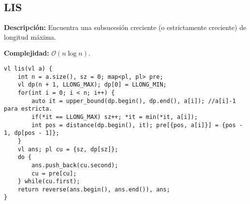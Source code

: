 \documentclass[twocolumn]{article}
\begin{document}
\subsection{LIS}
\begin{footnotesize}{\bf Descripción:} Encuentra una subsucesión creciente (o estrictamente creciente) de longitud máxima.


{\bf Complejidad:} $\mathcal{O}(n \log n)$.
\end{footnotesize}\lstset{basicstyle=\footnotesize\ttfamily,breaklines=true,tabsize=2,language=C++,frame=leftline, numbers=left, numberstyle=\tiny, numbersep=5pt}
\begin{lstlisting}
vl lis(vl a) {
	int n = a.size(), sz = 0; map<pl, pl> pre;
	vl dp(n + 1, LLONG_MAX); dp[0] = LLONG_MIN;
	for(int i = 0; i < n; i++) {
		auto it = upper_bound(dp.begin(), dp.end(), a[i]); //a[i]-1 para estricta.
		if(*it == LLONG_MAX) sz++; *it = min(*it, a[i]);
		int pos = distance(dp.begin(), it); pre[{pos, a[i]}] = {pos - 1, dp[pos - 1]};
	}
	vl ans; pl cu = {sz, dp[sz]};
	do {
		ans.push_back(cu.second);
		cu = pre[cu];
	} while(cu.first);
	return reverse(ans.begin(), ans.end()), ans;
}
\end{lstlisting}
\end{document}
